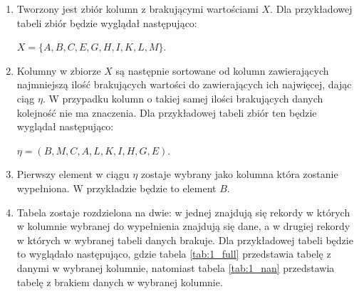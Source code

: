 \documentclass[12pt,twoside]{article}
\begin{document}
\begin{enumerate}[label=\arabic*), leftmargin=1.25cm]
    \item Tworzony jest zbiór kolumn z brakującymi wartościami $X$.
          Dla przykładowej tabeli zbiór będzie wyglądał następująco:

          $X=\{A,B,C,E,G,H,I,K,L,M\}$.
    \item Kolumny w zbiorze $X$ są następnie sortowane od kolumn zawierających
          najmniejszą ilość brakujących wartości do zawierających ich najwięcej, dając ciąg $\eta$.
          W przypadku kolumn o takiej samej ilości brakujących danych kolejność nie ma znaczenia.
          Dla przykładowej tabeli zbiór ten będzie wyglądał następująco:

          $\eta=(B,M,C,A,L,K,I,H,G,E)$.
    \item Pierwszy element w ciągu $\eta$ zostaje wybrany jako kolumna która zostanie wypełniona.
          W przykładzie będzie to element $B$.
    \item Tabela zostaje rozdzielona na dwie: w jednej znajdują się rekordy
          w których w kolumnie wybranej do wypełnienia znajdują się dane,
          a w drugiej rekordy w których w wybranej tabeli danych brakuje.
          Dla przykładowej tabeli będzie to wyglądało następująco,
          gdzie tabela \ref{tab:1_full} przedstawia tabelę z danymi w wybranej kolumnie,
          natomiast tabela \ref{tab:1_nan} przedstawia tabelę z brakiem danych w wybranej kolumnie.


\end{enumerate}
\end{document}
